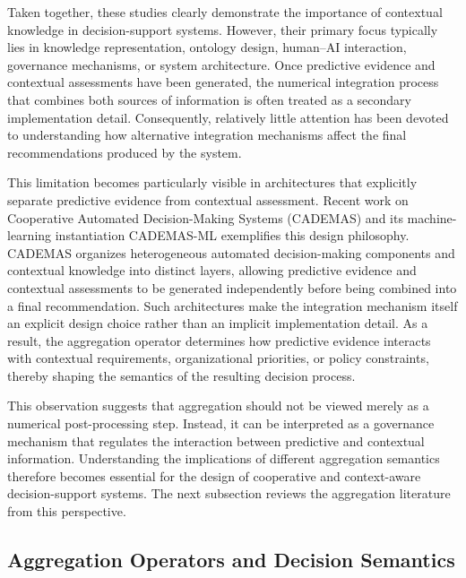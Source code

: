 \documentclass[mathematics,article,submit,moreauthors]{Definitions/mdpi}
\begin{document}
Taken together, these studies clearly demonstrate the importance of
contextual knowledge in decision-support systems. However, their primary
focus typically lies in knowledge representation, ontology design,
human--AI interaction, governance mechanisms, or system architecture.
Once predictive evidence and contextual assessments have been generated,
the numerical integration process that combines both sources of
information is often treated as a secondary implementation detail.
Consequently, relatively little attention has been devoted to
understanding how alternative integration mechanisms affect the final
recommendations produced by the system.

This limitation becomes particularly visible in architectures that
explicitly separate predictive evidence from contextual assessment.
Recent work on Cooperative Automated Decision-Making Systems (CADEMAS)
\citep{NovoaHernandez2026} and its machine-learning instantiation
CADEMAS-ML \citep{Godz2026} exemplifies this design philosophy.
CADEMAS organizes heterogeneous automated decision-making components and
contextual knowledge into distinct layers, allowing predictive evidence
and contextual assessments to be generated independently before being
combined into a final recommendation. Such architectures make the
integration mechanism itself an explicit design choice rather than an
implicit implementation detail. As a result, the aggregation operator
determines how predictive evidence interacts with contextual
requirements, organizational priorities, or policy constraints, thereby
shaping the semantics of the resulting decision process.

This observation suggests that aggregation should not be viewed merely
as a numerical post-processing step. Instead, it can be interpreted as a
governance mechanism that regulates the interaction between predictive
and contextual information. Understanding the implications of different
aggregation semantics therefore becomes essential for the design of
cooperative and context-aware decision-support systems. The next
subsection reviews the aggregation literature from this perspective. 

\subsection{Aggregation Operators and Decision Semantics}
\label{subsec:aggregation-operators-and-decision-semantics}

\end{document}
